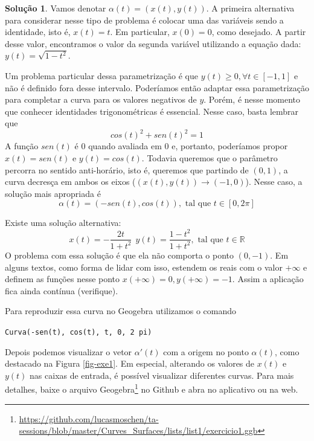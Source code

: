 \documentclass[a4paper,12pt]{article}
\newcommand{\R}{\mathbb{R}}
\theoremstyle{exer}
\theoremstyle{definition}
\newtheorem{solution}{Solução}
\theoremstyle{plain}
\begin{document}
\begin{solution}
    Vamos denotar $\alpha(t) = (x(t), y(t))$. A primeira alternativa para considerar nesse tipo de problema é colocar uma
    das variáveis sendo a identidade, isto é, $x(t) = t$. Em particular, $x(0) = 0$,
    como desejado. A partir desse valor, encontramos o valor da segunda
    variável utilizando a equação dada: $y(t) = \sqrt{1 -
    t^2}$. 

    Um problema particular dessa parametrização é que $y(t) \ge 0, \forall t
    \in [-1,1]$ e não é definido fora desse intervalo. Poderíamos então
    adaptar essa parametrização para completar a curva para os valores
    negativos de $y$. Porém, é nesse momento que conhecer identidades
    trigonométricas é essencial. Nesse caso, basta lembrar que 
    $$
    cos(t)^2 + sen(t)^2 = 1
    $$
    A função $sen(t)$ é 0 quando avaliada em $0$ e, portanto, poderíamos
    propor $x(t) = sen(t)$ e $y(t) = cos(t)$. Todavia queremos que o parâmetro
    percorra no sentido anti-horário, isto é, queremos que partindo de
    $(0,1)$, a curva decresça em ambos os eixos ($(x(t), y(t)) \to (-1,0)$).
    Nesse caso, a solução mais apropriada é 
    $$
    \alpha(t) = (-sen(t), cos(t)), \text{ tal que } t \in [0,2\pi]
    $$

    Existe uma solução alternativa:
    $$
    x(t) = -\frac{2t}{1 + t^2} ~~ y(t) = \frac{1 - t^2}{1 + t^2}, \text{ tal que } t \in \R
    $$
    O problema com essa solução é que ela não comporta o ponto $(0,-1)$.
    Em alguns textos, como forma de lidar com isso, estendem os reais com o valor
    $+ \infty$ e definem as funções nesse ponto $x(+ \infty) = 0, y(+ \infty)
    = -1$. Assim a aplicação fica ainda contínua (verifique).  

    Para reproduzir essa curva no Geogebra utilizamos o comando 
    \begin{center}
        {\tt Curva(-sen(t),  cos(t), t, 0, 2 pi)} 
    \end{center}
    Depois podemos visualizar o vetor $\alpha '(t)$ com a origem no ponto
    $\alpha(t)$, como destacado na Figura \ref{fig-exe1}. Em especial,
    alterando os valores de $x(t)$ e $y(t)$ nas caixas de entrada, é possível
    visualizar diferentes curvas. Para mais detalhes, baixe o arquivo Geogebra\footnote{\url{https://github.com/lucasmoschen/ta-sessions/blob/master/Curves_Surfaces/lists/list1/exercicio1.ggb}} no
    Github e abra no aplicativo ou na web. 


\end{solution}
\end{document}
